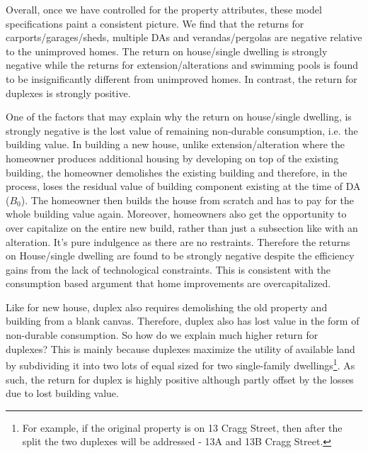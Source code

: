 \documentclass[AEJ,reqno, draftmode]{AEA} %
\begin{document}
Overall, once we have controlled for the property attributes, these model specifications paint a consistent picture. We find that the returns for carports/garages/sheds, multiple DAs and verandas/pergolas are negative relative to the unimproved homes. The return on house/single dwelling is strongly negative while the returns for extension/alterations and swimming pools is found to be insignificantly different from unimproved homes. In contrast, the return for duplexes is strongly positive.

One of the factors that may explain why the return on house/single dwelling, is strongly negative is the lost value of remaining non-durable consumption, i.e. the building value. In building a new house, unlike extension/alteration where the homeowner produces additional housing by developing on top of the existing building, the homeowner demolishes the existing building and therefore, in the process, loses the residual value of building component existing at the time of DA ($B_0$). The homeowner then builds the house from scratch and has to pay for the whole building value again. Moreover, homeowners also get the opportunity to over capitalize on the entire new build, rather than just a subsection like with an alteration. It's pure indulgence as there are no restraints. Therefore the returns on House/single dwelling are found to be strongly negative despite the efficiency gains from the lack of technological constraints. This is consistent with the consumption based argument that home improvements are overcapitalized.

Like for new house, duplex also requires demolishing the old property and building from a blank canvas. Therefore, duplex also has lost value in the form of non-durable consumption. So how do we explain much higher return for duplexes? This is mainly because duplexes maximize the utility of available land by subdividing it into two lots of equal sized for two single-family dwellings\footnote{For example, if the original property is on 13 Cragg Street, then after the split the two duplexes will be addressed - 13A and 13B Cragg Street.}. As such, the return for duplex is highly positive although partly offset by the losses due to lost building value.
\end{document}
